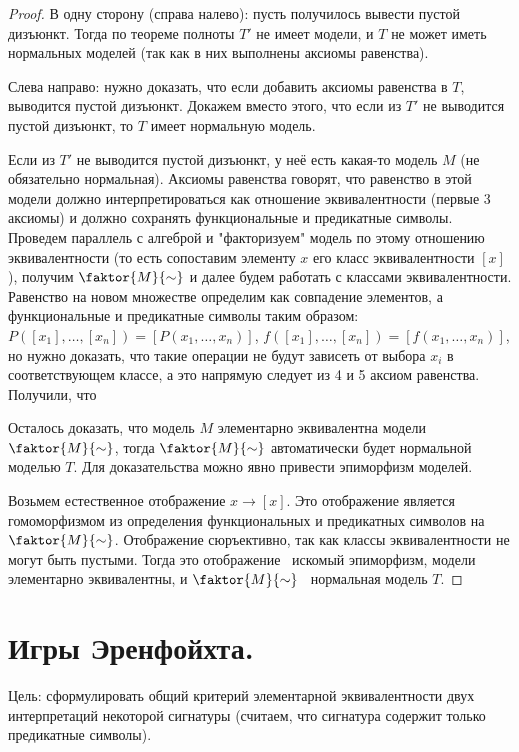 \documentclass{article}
\begin{document}
\begin{proof}
	В одну сторону (справа налево): пусть получилось вывести пустой дизъюнкт. Тогда по теореме полноты $T'$ не имеет модели, и $T$ не может иметь нормальных моделей (так как в них выполнены аксиомы равенства).

	Слева направо: нужно доказать, что если добавить аксиомы равенства в $T$, выводится пустой дизъюнкт. Докажем вместо этого, что если из $T'$ не выводится пустой дизъюнкт, то $T$ имеет нормальную модель.

	Если из $T'$ не выводится пустой дизъюнкт, у неё есть какая-то модель $M$ (не обязательно нормальная). Аксиомы равенства говорят, что равенство в этой модели должно интерпретироваться как отношение эквивалентности (первые 3 аксиомы) и должно сохранять функциональные и предикатные символы. Проведем параллель с алгеброй и "факторизуем" модель по этому отношению эквивалентности (то есть сопоставим элементу $x$ его класс эквивалентности $[x]$), получим $\faktor{M}{\sim}$ и далее будем работать с классами эквивалентности. Равенство на новом множестве определим как совпадение элементов, а функциональные и предикатные символы таким образом: $P([x_1], \dots, [x_n]) = \left[P(x_1, \dots, x_n)\right]$, $f([x_1], \dots, [x_n]) = \left[f(x_1, \dots, x_n)\right]$, но нужно доказать, что такие операции не будут зависеть от выбора $x_i$ в соответствующем классе, а это напрямую следует из 4 и 5 аксиом равенства. Получили, что

	Осталось доказать, что модель $M$ элементарно эквивалентна модели $\faktor{M}{\sim}$, тогда $\faktor{M}{\sim}$ автоматически будет нормальной моделью $T$. Для доказательства можно явно привести эпиморфизм моделей.

	Возьмем естественное отображение $x \rightarrow [x]$. Это отображение является гомоморфизмом из определения функциональных и предикатных символов на $\faktor{M}{\sim}$. Отображение сюръективно, так как классы эквивалентности не могут быть пустыми. Тогда это отображение \textemdash\ искомый эпиморфизм, модели элементарно эквивалентны, и $\faktor{M}{\sim}$ \textemdash\ нормальная модель $T$.
\end{proof}

\setcounter{section}{25}
\section{Игры Эренфойхта.}

Цель: сформулировать общий критерий
элементарной эквивалентности двух интерпретаций некоторой сигнатуры (считаем, что сигнатура содержит только предикатные символы).
\end{document}
